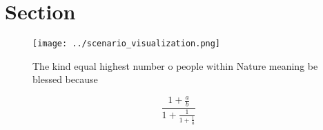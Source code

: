 \documentclass[a4paper]{article}
\begin{document}
\section{Section}

\begin{figure}
\centering
\texttt{[image: ../scenario\_visualization.png]}
\caption{The kind equal highest number o people within Nature meaning be blessed because
}
\end{figure}
 
\[ \frac{1+\frac{a}{b}}{1+\frac{1}{1+\frac{1}{a}}} \]
\end{document}
